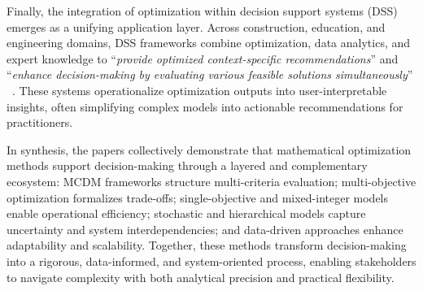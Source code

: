 \documentclass{sfuthesis}
\begin{document}
Finally, the integration of optimization within decision support systems (DSS) emerges as a unifying application layer. Across construction, education, and engineering domains, DSS frameworks combine optimization, data analytics, and expert knowledge to “\textit{provide optimized context-specific recommendations}” and “\textit{enhance decision-making by evaluating various feasible solutions simultaneously}” ~\cite{Sheikhkhoshkar2025ConstructionDSS}. These systems operationalize optimization outputs into user-interpretable insights, often simplifying complex models into actionable recommendations for practitioners.\par
In synthesis, the papers collectively demonstrate that mathematical optimization methods support decision-making through a layered and complementary ecosystem: MCDM frameworks structure multi-criteria evaluation; multi-objective optimization formalizes trade-offs; single-objective and mixed-integer models enable operational efficiency; stochastic and hierarchical models capture uncertainty and system interdependencies; and data-driven approaches enhance adaptability and scalability. Together, these methods transform decision-making into a rigorous, data-informed, and system-oriented process, enabling stakeholders to navigate complexity with both analytical precision and practical flexibility.
\end{document}
